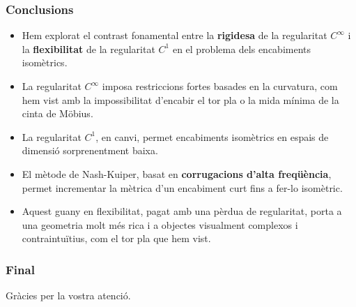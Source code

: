 \documentclass[10pt]{beamer}
\begin{document}
\begin{frame}
    \frametitle{Conclusions}
    
    \begin{itemize}
        \item Hem explorat el contrast fonamental entre la \textbf{rigidesa} de la regularitat $C^\infty$ i la \textbf{flexibilitat} de la regularitat $C^1$ en el problema dels encabiments isomètrics.
        \pause
        \item La regularitat $C^\infty$ imposa restriccions fortes basades en la curvatura, com hem vist amb la impossibilitat d'encabir el tor pla o la mida mínima de la cinta de Möbius.
        \pause
        \item La regularitat $C^1$, en canvi, permet encabiments isomètrics en espais de dimensió sorprenentment baixa.
        \pause
        \item El mètode de Nash-Kuiper, basat en \textbf{corrugacions d'alta freqüència}, permet incrementar la mètrica d'un encabiment curt fins a fer-lo isomètric.
        \pause
        \item Aquest guany en flexibilitat, pagat amb una pèrdua de regularitat, porta a una geometria molt més rica i a objectes visualment complexos i contraintuïtius, com el tor pla que hem vist.
    \end{itemize}
    
\end{frame}

\begin{frame}
    \frametitle{Final}
    \begin{center}
        \Huge
        Gràcies per la vostra atenció.
        

    \end{center}
\end{frame}
\end{document}
